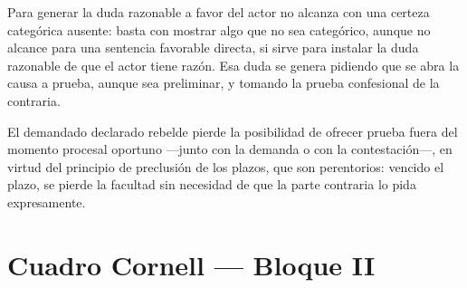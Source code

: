 \documentclass[12pt,oneside]{book}
\begin{document}
\begin{important}
Para generar la duda razonable a favor del actor no alcanza con una certeza categórica ausente: basta con mostrar algo que no sea categórico, aunque no alcance para una sentencia favorable directa, si sirve para instalar la duda razonable de que el actor tiene razón. Esa duda se genera pidiendo que se abra la causa a prueba, aunque sea preliminar, y tomando la prueba confesional de la contraria.
\end{important}

\begin{note}
El demandado declarado rebelde pierde la posibilidad de ofrecer prueba fuera del momento procesal oportuno —junto con la demanda o con la contestación—, en virtud del principio de preclusión de los plazos, que son perentorios: vencido el plazo, se pierde la facultad sin necesidad de que la parte contraria lo pida expresamente.
\end{note}

\section*{Cuadro Cornell — Bloque II}
\end{document}
